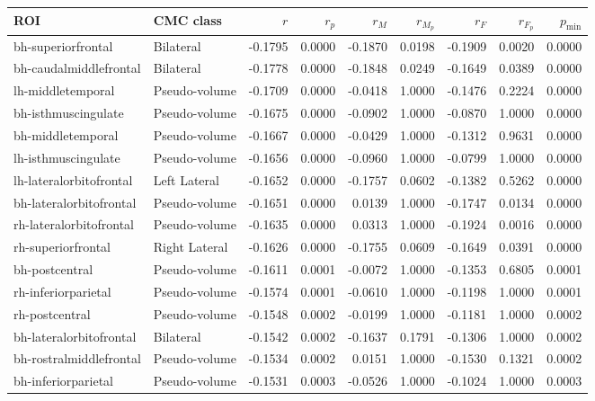 \documentclass{article}
\begin{document}
\begin{table}
\centering
\begin{tabular}{llrrrrrrr}
	\toprule
	ROI & CMC class & $r$ & $r_p$ & $r_M$ & $r_{M_p}$ & $r_F$ & $r_{F_p}$ & $p_{\min}$ \\
	\midrule
	bh-superiorfrontal & Bilateral & -0.1795 & 0.0000 & -0.1870 & 0.0198 & -0.1909 & 0.0020 & 0.0000 \\
	bh-caudalmiddlefrontal & Bilateral & -0.1778 & 0.0000 & -0.1848 & 0.0249 & -0.1649 & 0.0389 & 0.0000 \\
	lh-middletemporal & Pseudo-volume & -0.1709 & 0.0000 & -0.0418 & 1.0000 & -0.1476 & 0.2224 & 0.0000 \\
	bh-isthmuscingulate & Pseudo-volume & -0.1675 & 0.0000 & -0.0902 & 1.0000 & -0.0870 & 1.0000 & 0.0000 \\
	bh-middletemporal & Pseudo-volume & -0.1667 & 0.0000 & -0.0429 & 1.0000 & -0.1312 & 0.9631 & 0.0000 \\
	lh-isthmuscingulate & Pseudo-volume & -0.1656 & 0.0000 & -0.0960 & 1.0000 & -0.0799 & 1.0000 & 0.0000 \\
	lh-lateralorbitofrontal & Left Lateral & -0.1652 & 0.0000 & -0.1757 & 0.0602 & -0.1382 & 0.5262 & 0.0000 \\
	bh-lateralorbitofrontal & Pseudo-volume & -0.1651 & 0.0000 & 0.0139 & 1.0000 & -0.1747 & 0.0134 & 0.0000 \\
	rh-lateralorbitofrontal & Pseudo-volume & -0.1635 & 0.0000 & 0.0313 & 1.0000 & -0.1924 & 0.0016 & 0.0000 \\
	rh-superiorfrontal & Right Lateral & -0.1626 & 0.0000 & -0.1755 & 0.0609 & -0.1649 & 0.0391 & 0.0000 \\
	bh-postcentral & Pseudo-volume & -0.1611 & 0.0001 & -0.0072 & 1.0000 & -0.1353 & 0.6805 & 0.0001 \\
	rh-inferiorparietal & Pseudo-volume & -0.1574 & 0.0001 & -0.0610 & 1.0000 & -0.1198 & 1.0000 & 0.0001 \\
	rh-postcentral & Pseudo-volume & -0.1548 & 0.0002 & -0.0199 & 1.0000 & -0.1181 & 1.0000 & 0.0002 \\
	bh-lateralorbitofrontal & Bilateral & -0.1542 & 0.0002 & -0.1637 & 0.1791 & -0.1306 & 1.0000 & 0.0002 \\
	bh-rostralmiddlefrontal & Pseudo-volume & -0.1534 & 0.0002 & 0.0151 & 1.0000 & -0.1530 & 0.1321 & 0.0002 \\
	bh-inferiorparietal & Pseudo-volume & -0.1531 & 0.0003 & -0.0526 & 1.0000 & -0.1024 & 1.0000 & 0.0003 \\

\end{tabular}
\end{table}
\end{document}
